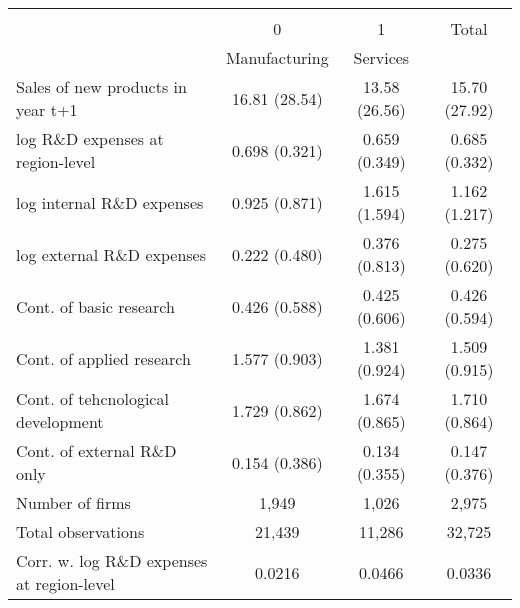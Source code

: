 \begin{tabular}{l*{3}{c}}
\hline\hline
                    &\multicolumn{3}{c}{}                  \\
                    &           0&           1&       Total\\
 &Manufacturing &Services\\\midrule
Sales of new products in year t+1&16.81 (28.54)&13.58 (26.56)&15.70 (27.92)\\
[1em]
log R\&D expenses at region-level&0.698 (0.321)&0.659 (0.349)&0.685 (0.332)\\
[1em]
log internal R\&D expenses&0.925 (0.871)&1.615 (1.594)&1.162 (1.217)\\
[1em]
log external R\&D expenses&0.222 (0.480)&0.376 (0.813)&0.275 (0.620)\\
[1em]
Cont. of basic research&0.426 (0.588)&0.425 (0.606)&0.426 (0.594)\\
[1em]
Cont. of applied research&1.577 (0.903)&1.381 (0.924)&1.509 (0.915)\\
[1em]
Cont. of tehcnological development&1.729 (0.862)&1.674 (0.865)&1.710 (0.864)\\
[1em]
Cont. of external R\&D only&0.154 (0.386)&0.134 (0.355)&0.147 (0.376)\\
\midrule Number of firms&1,949&1,026&2,975\\ Total observations&21,439&11,286&32,725\\
\midrule Corr. w. log R\&D expenses at region-level &0.0216&0.0466&0.0336\\\bottomrule\end{tabular}\\
